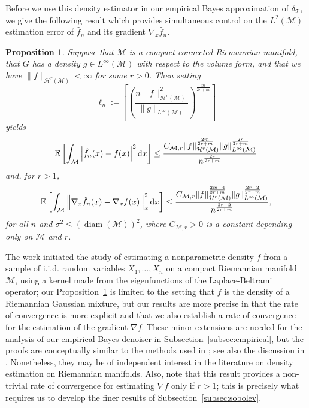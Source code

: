 \documentclass[preprint]{imsart}
\theoremstyle{plain}
\newtheorem{proposition}[theorem]{Proposition}
\theoremstyle{definition}
\newcommand{\Ebb}{\mathbb{E}}
\newcommand{\Mcal}{\mathcal{M}}
\newcommand{\Hcal}{\mathcal{H}}
\newcommand{\diff}{\textnormal{d}}
\newcommand{\T}{\mathcal{T}}
\DeclareMathOperator{\diam}{diam}
\begin{document}
    Before we use this density estimator in our empirical Bayes approximation of $\delta_{\T}$, we give the following result which provides simultaneous control on the $L^2(\Mcal)$ estimation error of $\hat f_n$ and its gradient $\nabla_x \hat{f}_n$.

\begin{proposition}\label{prop:kde-error}
    Suppose that $\Mcal$ is a compact connected Riemannian manifold, that $G$ has a density $g\in L^{\infty}(\Mcal)$ with respect to the volume form, and that we have $\|f\|_{\Hcal^r(\Mcal)}<\infty$ for some $r>0$.
    Then setting
    \begin{equation*}
        \ell_n :=\left\lceil \left(\frac{n\|f\|^2_{\Hcal^r(\Mcal)}}{\|g\|_{L^{\infty}(\Mcal)}}\right)^{\frac{m}{2r+m}}\right\rceil
    \end{equation*}
    yields
    \begin{equation*}
        \Ebb\left[\int_{\Mcal}\left|\hat{f}_n(x)-f(x)\right|^2\diff x\right] \le \frac{C_{\Mcal,r}\|f\|_{\Hcal^{r}(\Mcal)}^{\frac{2m}{2r+m}}\|g\|_{L^{\infty}(\Mcal)}^{\frac{2r}{2r+m}}}{n^{\frac{2r}{2r+m}}}
    \end{equation*}
    and, for $r >1$,
    \begin{equation*}
        \Ebb\left[\int_{\Mcal}\left\|\nabla_x\hat{f}_n(x)-\nabla_x f(x)\right\|_x^2\diff x\right] \le \frac{C_{\Mcal,r}\|f\|_{\Hcal^{r}(\Mcal)}^{\frac{2m+4}{2r+m}}\|g\|_{L^{\infty}(\Mcal)}^{\frac{2r-2}{2r+m}}}{n^{\frac{2r-2}{2r+m}}},
    \end{equation*}
    for all $n$ and $\sigma^2\le (\diam(\Mcal))^2$, where $C_{\Mcal,r}>0$ is a constant depending only on $\Mcal$ and $r$.
\end{proposition}

    The work \cite{Hendriks1990} initiated the study of estimating a nonparametric density $f$ from a sample of i.i.d. random variables $X_1,\ldots, X_n$ on a compact Riemannian manifold $\Mcal$, using a kernel made from the eigenfunctions of the Laplace-Beltrami operator;
    our Proposition~\ref{prop:kde-error} is limited to the setting that $f$ is the density of a Riemannian Gaussian mixture, but our results are more precise in that the rate of convergence is more explicit and that we also establish a rate of convergence for the estimation of the gradient $\nabla f$.
    These minor extensions are needed for the analysis of our empirical Bayes denoiser in Subsection~\ref{subsec:empirical}, but the proofs are conceptually similar to the methods used in \cite{Hendriks1990}; see also the discussion in \cite[Section~4.6]{Hendriks1990}.
    Nonetheless, they may be of independent interest in the literature on density estimation on Riemannian manifolds.
    Also, note that this result provides a non-trivial rate of convergence for estimating $\nabla f$ only if $r>1$; this is precisely what requires us to develop the finer results of Subsection~\ref{subsec:sobolev}.
\end{document}

